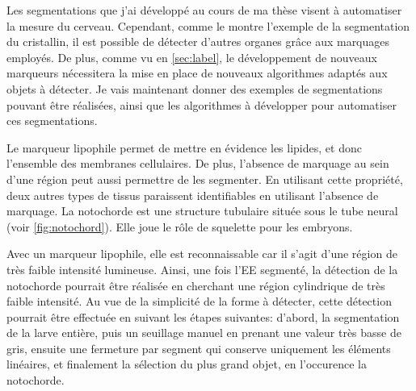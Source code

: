 \documentclass[\main/main.tex]{subfiles}
\begin{document}
%   
Les segmentations que j'ai développé au cours de ma thèse visent à automatiser la mesure du cerveau.
%
Cependant, comme le montre l'exemple de la segmentation du cristallin,
il est possible de détecter d'autres organes grâce aux marquages employés.
%
De plus, comme vu en \autoref{sec:label}, le développement de nouveaux marqueurs nécessitera la mise en place de nouveaux algorithmes adaptés aux objets à détecter.
%
Je vais maintenant donner des exemples de segmentations pouvant être réalisées, ainsi que les algorithmes à développer pour automatiser ces segmentations.

%
Le marqueur lipophile permet de mettre en évidence les lipides, et donc l'ensemble des membranes cellulaires. De plus, l'absence de marquage au sein d'une région peut aussi permettre de les segmenter.
%
En utilisant cette propriété, deux autres types de tissus paraissent identifiables en utilisant l'absence de marquage. La notochorde est une structure tubulaire située sous le tube neural (voir \autoref{fig:notochord}). Elle joue le rôle de squelette pour les embryons.


Avec un marqueur lipophile, elle est reconnaissable car il s'agit d'une région de très faible intensité lumineuse. Ainsi, une fois l'EE segmenté,
la détection de la notochorde pourrait être réalisée en cherchant une région cylindrique de très faible intensité.
%
Au vue de la simplicité de la forme à détecter, cette détection pourrait être effectuée en suivant les étapes suivantes: d'abord, la segmentation de la larve entière, puis un seuillage manuel en prenant une valeur très basse de gris, ensuite une fermeture par segment qui conserve uniquement les éléments linéaires, et finalement la sélection du plus grand objet, en l'occurence la notochorde.
\end{document}
